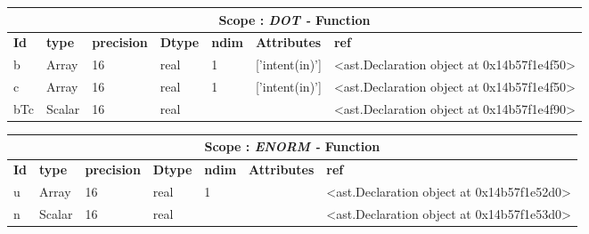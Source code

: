 \documentclass{report}
\begin{document}
 \vspace{1cm}

\begin{center}
\begin{longtable}{|p{3.5cm}|p{1.5cm}|p{1.5cm}|p{1.5cm}|p{1cm}|p{2cm}|p{4cm}| }
\hline
\multicolumn{7}{|c|}{\textbf{Scope : \qquad}  \textbf{\textit{DOT - }Function}}\\ 
\hline
\textbf{Id} & \textbf{type} & \textbf{precision} & \textbf{Dtype} & \textbf{ndim} & \textbf{Attributes} & \textbf{ref} \\\hline

b & Array & 16 & real & 1 & ['intent(in)'] & <ast.Declaration object at 0x14b57f1e4f50> \\\hline

c & Array & 16 & real & 1 & ['intent(in)'] & <ast.Declaration object at 0x14b57f1e4f50> \\\hline

bTc & Scalar & 16 & real &  &  & <ast.Declaration object at 0x14b57f1e4f90> \\\hline

\end{longtable}
\end{center}

 \vspace{1cm}

\begin{center}
\begin{longtable}{|p{3.5cm}|p{1.5cm}|p{1.5cm}|p{1.5cm}|p{1cm}|p{2cm}|p{4cm}| }
\hline
\multicolumn{7}{|c|}{\textbf{Scope : \qquad}  \textbf{\textit{ENORM - }Function}}\\ 
\hline
\textbf{Id} & \textbf{type} & \textbf{precision} & \textbf{Dtype} & \textbf{ndim} & \textbf{Attributes} & \textbf{ref} \\\hline

u & Array & 16 & real & 1 &  & <ast.Declaration object at 0x14b57f1e52d0> \\\hline

n & Scalar & 16 & real &  &  & <ast.Declaration object at 0x14b57f1e53d0> \\\hline

\end{longtable}
\end{center}

 \vspace{1cm}
\end{document}
